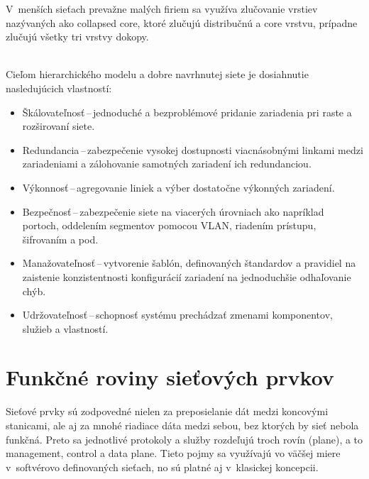 \noindent
V~menších sieťach prevažne malých firiem sa využíva zlučovanie vrstiev nazývaných ako collapsed core, ktoré zlučujú distribučnú a core vrstvu, prípadne zlučujú všetky tri vrstvy dokopy. 

\noindent
\\
Cieľom hierarchického modelu a dobre navrhnutej siete je dosiahnutie nasledujúcich vlastností:

\begin{itemize}
	\item Škálovateľnosť\,--\,jednoduché a bezproblémové pridanie zariadenia pri raste a rozširovaní siete.
	\item Redundancia\,--\,zabezpečenie vysokej dostupnosti viacnásobnými linkami medzi zariadeniami a zálohovanie samotných zariadení ich redundanciou.
	\item Výkonnosť\,--\,agregovanie liniek a výber dostatočne výkonných zariadení.
	\item Bezpečnosť\,--\,zabezpečenie siete na viacerých úrovniach ako napríklad portoch, oddelením segmentov pomocou VLAN, riadením prístupu, šifrovaním a pod.
	\item Manažovateľnosť\,--\,vytvorenie šablón, definovaných štandardov a pravidiel na zaistenie konzistentnosti konfigurácií zariadení na jednoduchšie odhaľovanie chýb. 
	\item Udržovateľnosť\,--\,schopnosť systému prechádzať zmenami komponentov, služieb a vlastností.
\end{itemize}



\section{Funkčné roviny sieťových prvkov}
Sieťové prvky sú zodpovedné nielen za preposielanie dát medzi koncovými stanicami, ale aj za mnohé riadiace dáta medzi sebou, bez ktorých by sieť nebola funkčná. Preto sa jednotlivé protokoly a služby rozdeľujú troch rovín (plane), a to management, control a data plane. Tieto pojmy sa využívajú vo väčšej miere v~softvérovo definovaných sieťach, no sú platné aj v~klasickej koncepcii.
 
